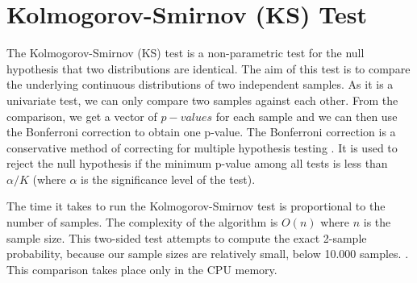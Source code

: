 \documentclass[12pt]{report}
\begin{document}

\section{Kolmogorov-Smirnov (KS) Test}
The Kolmogorov-Smirnov (KS) test is a non-parametric test for the null hypothesis that two distributions are identical.
The aim of this test is to compare the underlying continuous distributions of two independent samples.
As it is a univariate test, we can only compare two samples against each other.
From the comparison, we get a vector of \(p-values\) for each sample and we can then use the Bonferroni correction to obtain one p-value.
The Bonferroni correction is a conservative method of correcting for multiple hypothesis testing \cite{blandStatisticsNotesMultiple1995}.
It is used to reject the null hypothesis if the minimum p-value among all tests is less than \(\alpha/K\) (where \(\alpha\) is the significance level of the test).

The time it takes to run the Kolmogorov-Smirnov test is proportional to the number of samples.
The complexity of the algorithm is \(O(n)\) where \(n\) is the sample size.
This two-sided test attempts to compute the exact 2-sample probability, because our sample sizes are relatively small, below 10.000 samples. \cite{hodgesSignificanceProbabilitySmirnov1958}.
This comparison takes place only in the CPU memory.
\end{document}
